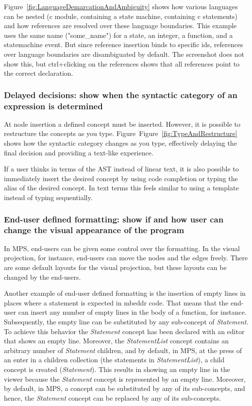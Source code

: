 \documentclass[preprint,numbers,10pt]{sigplanconf}
\begin{document}
Figure~\ref{fig:LanguageDemarcationAndAmbiguity} shows how various languages can be nested (c module, containing a state machine, containing c statements) and how references are resolved over these language boundaries. This example uses the same name ("some\_name") for a state, an integer, a function, and a statemachine event. But since reference insertion binds to specific ids, references over language boundaries are disambiguated by default. The screenshot does not show this, but ctrl+clicking on the references shows that all references point to the correct declaration.

\subsubsection{Delayed decisions: show when the syntactic category of an expression is determined}
At node insertion a defined concept must be inserted. However, it is possible to restructure the concepts as you type. Figure~Figure~\ref{fig:TypeAndRestructure} shows how the syntactic category changes as you type, effectively delaying the final decision and providing a text-like experience.

If a user thinks in terms of the AST instead of linear text, it is also possible to immediately insert the desired concept by using code completion or typing the alias of the desired concept. In text terms this feels similar to using a template instead of typing sequentially.

\subsubsection{End-user defined formatting: show if and how user can change the visual appearance of the program}
In MPS, end-users can be given some control over the formatting. In the visual projection, for instance,
end-users can move the nodes and the edges freely. There are some default layouts for the visual projection, but these
layouts can be changed by the end-users.

Another example of end-user defined formatting is the insertion of
empty lines in places where a statement is expected in mbeddr code. That means that the end-user can insert any number
of empty lines in the body of a function, for instance. Subsequently, the empty line can be substituted by any sub-concept of \emph{Statement}.
To achieve this behavior the \emph{Statement} concept has been declared with an editor that shows an empty line.
Moreover, the \emph{StatementList} concept contains an arbitrary number of \emph{Statement} children, and by default,
in MPS, at the press of an enter in a children collection (the statements in \emph{StatementList}), a child concept is created (\emph{Statement}).
This results in showing an empty line in the viewer because the \emph{Statement} concept is represented by an empty line.
Moreover, by default, in MPS, a concept can be substituted by any of its sub-concepts, and hence,
the \emph{Statement} concept can be replaced by any of its sub-concepts.
\end{document}
